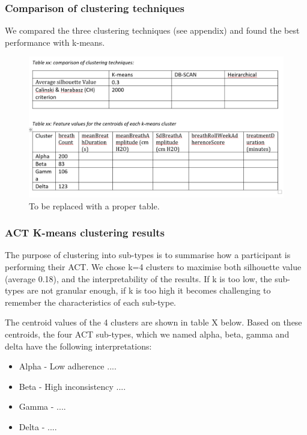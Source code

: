 \documentclass{article}
\begin{document}
\subsubsection{Comparison of clustering techniques}
We compared the three clustering techniques (see appendix) and found the best performance with k-means. 


\begin{figure}[!htb]
  \centering
  \includegraphics[width=\textwidth]{featureTables.png}
  \caption{To be replaced with a proper table.}
\end{figure}


\subsubsection{ACT K-means clustering results}
The purpose of clustering into sub-types is to summarise how a participant is performing their ACT. We chose k=4 clusters to maximise both silhouette value (average 0.18), and the interpretability of the results. If k is too low, the sub-types are not granular enough, if k is too high it becomes challenging to remember the characteristics of each sub-type. 

The centroid values of the 4 clusters are shown in table X below. Based on these centroids, the four ACT sub-types, which we named alpha, beta, gamma and delta have the following interpretations: 

\begin{itemize}
\item Alpha - Low adherence  ....
\item Beta - High inconsistency ....
\item Gamma -  ....
\item Delta -  ....
\end{itemize}
\end{document}
